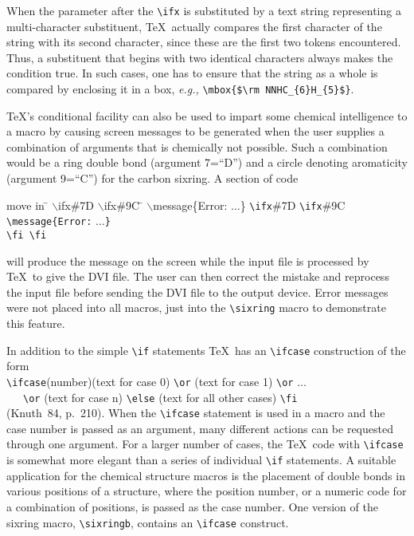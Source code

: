  When the parameter after the \verb+\ifx+ is substituted by a
 text string representing a multi-character substituent, \TeX\
 actually compares the first character of the string with its
 second character, since these are the first two tokens
 encountered. Thus, a substituent that begins with two identical
 characters always makes the condition true. In such cases,
 one has to ensure that the string as a whole is compared by
 enclosing it in a box, {\it e.g.,\/}
 \verb+\mbox{$\rm NNHC_{6}H_{5}$}+.
 
 \TeX's conditional facility can also be used to impart some
 chemical intelligence to a macro by causing screen messages
 to be generated when the user supplies a combination of
 arguments that is chemically not possible. Such a combination
 would be a ring double bond (argument 7=``D'') and a
 circle denoting aromaticity (argument 9=``C'') for the
 carbon sixring. A section of code
 
 \begin{tabbing}
  move in \= $\backslash $ifx\#7D  $\backslash $ifx\#9C
          \= $\backslash $message\{Error: $\ldots $\}\+ \kill
          \verb+\ifx+\#7D \verb+\ifx+\#9C \> \+ \\
          \verb+\message{Error:+ $\ldots $\verb+}+ \- \\
          \verb+\fi \fi+
  \end{tabbing}
 
 will produce the message on the screen while the input
 file is processed by \TeX\  to give the DVI file. The user
 can then correct the mistake and reprocess the input file
 before sending the DVI file to the output device.
 Error messages were not placed into all macros, just into
 the \verb+\sixring+ macro to demonstrate this feature.
 
 In addition to the simple \verb+\if+ statements \TeX\  has
 an \verb+\ifcase+ construction of the form \\
 \indent \verb+\ifcase+(number)(text for case 0) \verb+\or+
         (text for case 1) \verb+\or+ $\ldots $ \\
 \indent \ \ \ \verb+\or+ (text for case n) \verb+\else+
         (text for all other cases)  \verb+\fi+  \\
 (Knuth~84, p.~210). When the \verb+\ifcase+ statement
 is used in a macro and the case number is passed as an
 argument, many different actions can be requested
 through one argument. For a larger number of cases, the
 \TeX\  code with \verb+\ifcase+ is somewhat more elegant
 than a series of individual \verb+\if+ statements.
 A suitable application for the chemical structure
 macros is the placement of double bonds in various
 positions of a structure, where the position number,
 or a numeric code for a combination of positions,
 is passed as the case number.  One version of the
 sixring macro, \verb+\sixringb+, contains an
 \verb+\ifcase+ construct.
 

